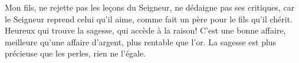 Mon fils, ne rejette pas les leçons du Seigneur,
	ne dédaigne pas ses critiques,
	car le Seigneur reprend celui qu’il aime,
	comme fait un père pour le fils qu’il chérit.
Heureux qui trouve la sagesse, qui accède à la raison!
	C’est une bonne affaire, meilleure qu’une affaire d’argent,
		plus rentable que l’or.
La sagesse est plus précieuse que les perles, rien ne l’égale.
